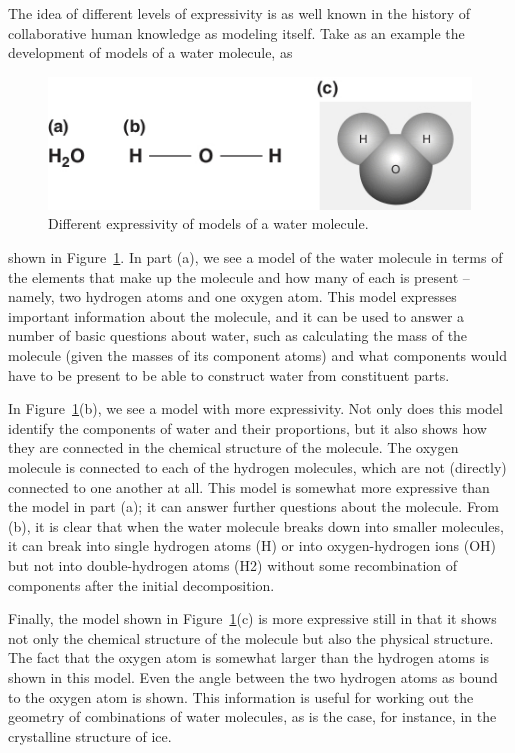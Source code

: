 The idea of different levels of expressivity is as well known in the
history of collaborative human knowledge as modeling itself. Take as an
example the development of models of a water molecule, as

\begin{figure}
    \centering
    \includegraphics[width=5.0in]{media/ch2/f02-04ac-9780123859655.jpg}
    \caption{Different expressivity of models of a water molecule.}
    \label{fig:ch2.4}
\end{figure}


shown in Figure~\ref{fig:ch2.4}. In part (a), we see a model of the water molecule
in terms of the elements that make up the molecule and how many of each
is present -- namely, two hydrogen atoms and one oxygen atom. This model
expresses important information about the molecule, and it can be used
to answer a number of basic questions about water, such as calculating
the mass of the molecule (given the masses of its component atoms) and
what components would have to be present to be able to construct water
from constituent parts.

In Figure~\ref{fig:ch2.4}(b), we see a model with more expressivity. Not only does
this model identify the components of water and their proportions, but
it also shows how they are connected in the chemical structure of the
molecule. The oxygen molecule is connected to each of the hydrogen
molecules, which are not (directly) connected to one another at all.
This model is somewhat more expressive than the model in part (a); it
can answer further questions about the molecule. From (b), it is clear
that when the water molecule breaks down into smaller molecules, it can
break into single hydrogen atoms (H) or into oxygen-hydrogen ions (OH)
but not into double-hydrogen atoms (H2) without some recombination of
components after the initial decomposition.

Finally, the model shown in Figure~\ref{fig:ch2.4}(c) is more expressive still in
that it shows not only the chemical structure of the molecule but also
the physical structure. The fact that the oxygen atom is somewhat larger
than the hydrogen atoms is shown in this model. Even the angle between
the two hydrogen atoms as bound to the oxygen atom is shown. This
information is useful for working out the geometry of combinations of
water molecules, as is the case, for instance, in the crystalline
structure of ice.

